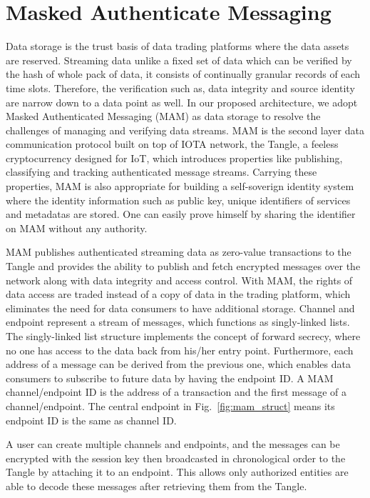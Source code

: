 \documentclass[conference]{IEEEtran}
\begin{document}
\section{Masked Authenticate Messaging}
Data storage is the trust basis of data trading platforms where the data assets are reserved. Streaming data unlike a fixed set of data which can be verified by the hash of whole pack of data, it consists of continually granular records of each time slots. Therefore, the verification such as, data integrity and source identity are narrow down to a data point as well. In our proposed architecture, we adopt Masked Authenticated Messaging (MAM)\cite{MAM} as data storage to resolve the challenges of managing and verifying data streams. MAM is the second layer data communication protocol built on top of IOTA\cite{IOTAwhitepaper} network, the Tangle, a feeless cryptocurrency designed for IoT, which introduces properties like publishing, classifying and tracking authenticated message streams. Carrying these properties, MAM is also appropriate for building a self-soverign identity system where the identity information such as public key, unique identifiers of services and metadatas are stored. One can easily prove himself by sharing the identifier on MAM without any authority. 

MAM publishes authenticated streaming data as zero-value transactions to the Tangle and provides the ability to publish and fetch encrypted messages over the network along with data integrity and access control. With MAM, the rights of data access are traded instead of a copy of data in the trading platform, which eliminates the need for data consumers to have additional storage. Channel and endpoint represent a stream of messages, which functions as singly-linked lists. The singly-linked list structure implements the concept of forward secrecy, where no one has access to the data back from his/her entry point. Furthermore, each address of a message can be derived from the previous one, which enables data consumers to subscribe to future data by having the endpoint ID. A MAM channel/endpoint ID is the address of a transaction and the first message of a channel/endpoint. The central endpoint in Fig.~\ref{fig:mam_struct} means its endpoint ID is the same as channel ID. 

A user can create multiple channels and endpoints, and the messages can be encrypted with the session key then broadcasted in chronological order to the Tangle by attaching it to an endpoint. This allows only authorized entities are able to decode these messages after retrieving them from the Tangle. 
\end{document}
